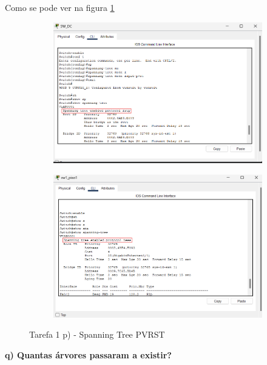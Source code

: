 \documentclass[11pt,english, openright, oneside]{book}
\begin{document}
Como se pode ver na figura \ref{fig:1p}
\vspace{0.4cm}
\begin{figure}[h]
    \centering
    \begin{subfigure}{.53\textwidth}
        \centering
        \includegraphics[width=0.99\linewidth]{imagens/Tarefa1/1.p.png}
    \end{subfigure}%
    \begin{subfigure}{.53\textwidth}
        \centering
        \includegraphics[width=0.99\linewidth]{imagens/Tarefa1/1.p.2.png}
    \end{subfigure}
    \caption{Tarefa 1 p) - Spanning Tree PVRST}
    \label{fig:1p}
\end{figure}
\vspace{0.8cm}


\textbf{q) Quantas árvores passaram a existir?}
\vspace{0.2cm}
\end{document}
